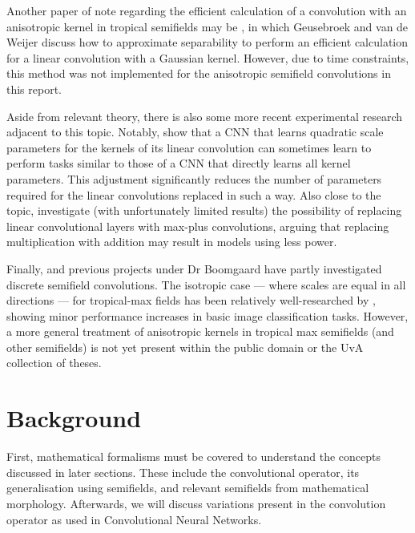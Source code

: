 \documentclass[a4paper, 12pt]{report}
\begin{document}
Another paper of note regarding the efficient calculation of a convolution with an anisotropic kernel in tropical semifields may be \cite{fastanifilter}, in which Geusebroek and van de Weijer discuss how to approximate separability to perform an efficient calculation for a linear convolution with a Gaussian kernel. However, due to time constraints, this method was not implemented for the anisotropic semifield convolutions in this report.

Aside from relevant theory, there is also some more recent experimental research adjacent to this topic. Notably, \cite{qlin1, qlin2} show that a CNN that learns quadratic scale parameters for the kernels of its linear convolution can sometimes learn to perform tasks similar to those of a CNN that directly learns all kernel parameters. This adjustment significantly reduces the number of  parameters required for the linear convolutions replaced in such a way. Also close to the topic, \cite{fan2021alternative} investigate (with unfortunately limited results) the possibility of replacing linear convolutional layers with max-plus convolutions, arguing that replacing multiplication with addition may result in models using less power.

Finally, \cite{groenendijk2022morphpool} and previous projects under Dr Boomgaard have partly investigated discrete semifield convolutions. The isotropic case --- where scales are equal in all directions --- for tropical-max fields has been relatively well-researched by \cite{thierrybsc, koenbsc}, showing minor performance increases in basic image classification tasks. However, a more general treatment of anisotropic kernels in tropical max semifields (and other semifields) is not yet present within the public domain or the UvA collection of theses.

\chapter{Background}
First, mathematical formalisms must be covered to understand the concepts discussed in later sections. These include the convolutional operator, its generalisation using semifields, and relevant semifields from mathematical morphology. Afterwards, we will discuss variations present in the convolution operator as used in Convolutional Neural Networks.
\end{document}
